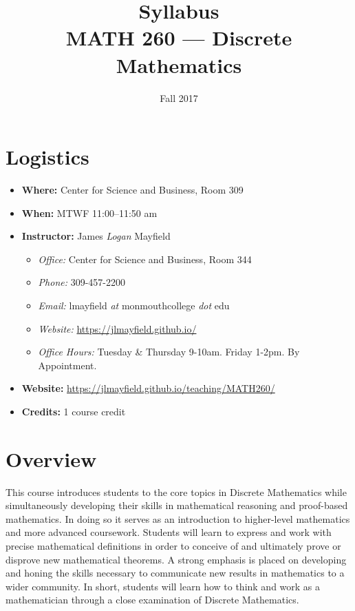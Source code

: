 \documentclass[nobib]{tufte-handout}
\title{Syllabus \\ MATH 260 --- Discrete Mathematics}
\author{}
\date{ Fall 2017 }
\begin{document}
\maketitle

\section{Logistics}
\begin{itemize}
\item \textbf{Where: } Center for Science and Business, Room 309
\item \textbf{When: } MTWF 11:00--11:50 am
\item \textbf{Instructor:} James \textit{Logan} Mayfield
\begin{itemize}
\item \textit{Office: } Center for Science and Business, Room 344
\item \textit{Phone: } 309-457-2200 %
\item \textit{Email: } lmayfield \textit{at} monmouthcollege \textit{dot} edu
\item \textit{Website: } \url{https://jlmayfield.github.io/}
\item \textit{Office Hours: } Tuesday \& Thursday 9-10am. Friday 1-2pm. By Appointment.
\end{itemize}
\item \textbf{Website: } \url{https://jlmayfield.github.io/teaching/MATH260/}
\item \textbf{Credits: } 1 course credit
\end{itemize}

\section{Overview}

This course introduces students to the core topics in Discrete Mathematics while simultaneously developing their skills in mathematical reasoning and proof-based mathematics. In doing so it serves as an introduction to higher-level mathematics and more advanced coursework. Students will learn to express and work with precise mathematical definitions in order to  conceive of and ultimately prove or disprove new mathematical theorems.  A strong emphasis is placed on developing and honing the skills necessary to communicate new results in mathematics to a wider community.  In short, students will learn how to think and work as a mathematician through a close examination of Discrete Mathematics.
\end{document}
